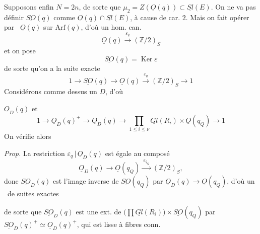 \documentclass[11pt,a4paper]{article}
\begin{document}
Supposons enfin $N=2n$, de sorte que $\mu_2 = Z(\underline{O}(q))\subset\underline{Sl}(E)$.
On ne va pas définir $\underline{SO}(q)$ comme $\underline{O}(q)\cap\underline{Sl}(E)$, à
cause de car. $2$. Mais on fait opérer par \ $\underline{O}(q)$ sur
$\underline{\mathrm{Arf}}(q)$, d'où un hom. can.
\[
\underline{O}(q) \xrightarrow{\ \varepsilon_q\ } (\mathbb{Z}/2)_S
\]
et on pose
\[
\underline{SO}(q) = \operatorname{Ker}\varepsilon
\]
de sorte qu'on a la suite exacte
\[
1\longrightarrow \underline{SO}(q) \longrightarrow \underline{O}(q) \xrightarrow{\ \varepsilon_q\ } (\mathbb{Z}/2)_S \longrightarrow 1
\]
Considérons comme dessus un $D$, d'où

$\underline{O}_D(q)$ et
\[
1\longrightarrow \underline{O}_D(q)^{+} \longrightarrow \underline{O}_D(q) \longrightarrow \prod_{1\le i\le\nu}\underline{Gl}(R_i)\times\underline{O}(q_Q) \longrightarrow 1
\]
On vérifie alors


\emph{Prop.} La restriction $\varepsilon_q\,|\,\underline{O}_D(q)$ est égale au
composé
\[
\underline{O}_D(q) \longrightarrow \underline{O}(q_Q) \xrightarrow{\ \varepsilon_{q_Q}\ } (\mathbb{Z}/2)_S ,
\]
donc $\underline{SO}_D(q)$ est l'image inverse de $\underline{SO}(q_Q)$ par
$\underline{O}_D(q)\to\underline{O}(q_Q)$, d'où un \ de
suites exactes
\struck{\ill{}}


de sorte que $\underline{SO}_D(q)$ est une ext. de
$\bigl(\prod\underline{Gl}(R_i)\bigr)\times\underline{SO}(q_Q)$ par
$\underline{SO}_D(q)^{+}\simeq\underline{O}_D(q)^{+}$, qui est lisse à fibres conn.
\end{document}
